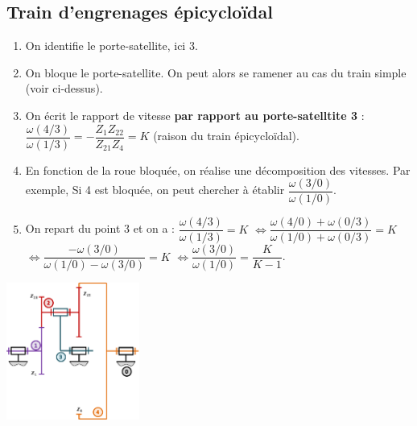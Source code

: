 \subsection*{Train d'engrenages épicycloïdal}
\begin{minipage}[c]{.65\linewidth}
\begin{methode}
\begin{enumerate}
\item On identifie le porte-satellite, ici 3.
\item On bloque le porte-satellite. On peut alors se ramener au cas du train simple (voir ci-dessus). 
\item On écrit le rapport de vitesse \textbf{par rapport au porte-satelltite 3} :$
\dfrac{\omega(4/3)}{\omega(1/3)}=-\dfrac{Z_1Z_{22}}{Z_{21}Z_4} = K
$ (raison du train épicycloïdal).
\item En fonction de la roue bloquée, on réalise une décomposition des vitesses. Par exemple, Si 4 est bloquée, on   peut chercher à établir $\dfrac{\omega(3/0)}{\omega(1/0)}$. 
\item On repart du point 3 et on a : $\dfrac{\omega(4/3)}{\omega(1/3)}= K$
$\Leftrightarrow \dfrac{\omega(4/0)+\omega(0/3)}{\omega(1/0)+\omega(0/3)}= K$
$\Leftrightarrow \dfrac{-\omega(3/0)}{\omega(1/0)-\omega(3/0)}= K$
$\Leftrightarrow \dfrac{\omega(3/0)}{\omega(1/0)} = \dfrac{K}{K-1}$.
\end{enumerate}
\end{methode}
\end{minipage}\hfill
\begin{minipage}[c]{.35\linewidth}
\begin{center}
\includegraphics[height=4.5cm]{images/fig_05.png}
\end{center}
\end{minipage}

